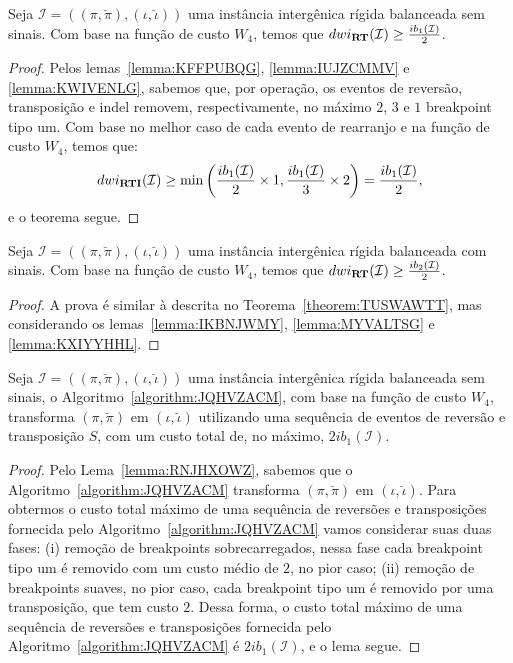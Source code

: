 \begin{theorem}\label{theorem:TUSWAWTT}
Seja $\mathcal{I} = ((\pi,\breve\pi),(\iota,\breve\iota))$ uma instância intergênica rígida balanceada sem sinais. Com base na função de custo $W_4$, temos que $dwi_{\textbf{RT}}(\mathcal{I}) \ge \frac{ib_1(\mathcal{I})}{2}$.
\begin{proof}
Pelos lemas~\ref{lemma:KFFPUBQG}, \ref{lemma:IUJZCMMV} e \ref{lemma:KWIVENLG}, sabemos que, por operação, os eventos de reversão, transposição e indel removem, respectivamente, no máximo $2$, $3$ e $1$ breakpoint tipo um. Com base no melhor caso de cada evento de rearranjo e na função de custo $W_4$, temos que:
$$dwi_{\textbf{RTI}}(\mathcal{I}) \ge \min\left(\frac{ib_1(\mathcal{I})}{2} \times 1,\frac{ib_1(\mathcal{I})}{3} \times 2\right) = \frac{ib_1(\mathcal{I})}{2},$$ e o teorema segue.
\end{proof}
\end{theorem}

\begin{theorem}\label{theorem:RPTOVHAP}
Seja $\mathcal{I} = ((\pi,\breve\pi),(\iota,\breve\iota))$ uma instância intergênica rígida balanceada com sinais. Com base na função de custo $W_4$, temos que $dwi_{\textbf{RT}}(\mathcal{I}) \ge \frac{ib_2(\mathcal{I})}{2}$.
\begin{proof}
A prova é similar à descrita no Teorema~\ref{theorem:TUSWAWTT}, mas considerando os lemas~\ref{lemma:IKBNJWMY}, \ref{lemma:MYVALTSG} e \ref{lemma:KXIYYHHL}.
\end{proof}
\end{theorem}

\begin{lemma}\label{lemma:DDSJVECJ}
Seja $\mathcal{I}=((\pi,\breve\pi),(\iota,\breve\iota))$ uma instância intergênica rígida balanceada sem sinais, o Algoritmo~\ref{algorithm:JQHVZACM}, com base na função de custo $W_4$, transforma $(\pi,\breve\pi)$ em $(\iota,\breve\iota)$ utilizando uma sequência de eventos de reversão e transposição $S$, com um custo total de, no máximo, $2ib_1(\mathcal{I})$.
\end{lemma}
\begin{proof}
Pelo Lema~\ref{lemma:RNJHXOWZ}, sabemos que o Algoritmo~\ref{algorithm:JQHVZACM} transforma $(\pi,\breve\pi)$ em $(\iota,\breve\iota)$. Para obtermos o custo total máximo de uma sequência de reversões e transposições fornecida pelo Algoritmo~\ref{algorithm:JQHVZACM} vamos considerar suas duas fases: (i) remoção de breakpoints sobrecarregados, nessa fase cada breakpoint tipo um é removido com um custo médio de $2$, no pior caso; (ii) remoção de breakpoints suaves, no pior caso, cada breakpoint tipo um é removido por uma transposição, que tem custo $2$. Dessa forma, o custo total máximo de uma sequência de reversões e transposições fornecida pelo Algoritmo~\ref{algorithm:JQHVZACM} é $2ib_1(\mathcal{I})$, e o lema segue. 
\end{proof}

